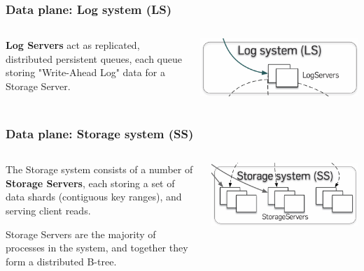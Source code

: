 


\begin{frame}
    \frametitle{Data plane: Log system (LS)}
    \begin{columns}
        \begin{column}{0.5\textwidth}
        \textbf{Log Servers} act as replicated, distributed persistent queues, each queue storing "Write-Ahead Log" data for a Storage Server.
        
        \end{column}
        \begin{column}{0.5\textwidth}
            \centering
            \includegraphics[width=\textwidth]{img/2-Architecture/log system.png}
        \end{column}
    \end{columns}
\end{frame}



\begin{frame}
    \frametitle{Data plane: Storage system (SS)}
    \begin{columns}
        \begin{column}{0.5\textwidth}
        The Storage system consists of a number of \textbf{Storage Servers}, each
storing a set of data shards (contiguous key ranges),
and serving client reads. 
\vspace{0.5cm}

Storage Servers are the majority of processes in the system, and together they form a distributed B-tree.
        
        \end{column}
        \begin{column}{0.5\textwidth}
            \centering
            \includegraphics[width=\textwidth]{img/2-Architecture/Storage system.png}
        \end{column}
    \end{columns}
\end{frame}


